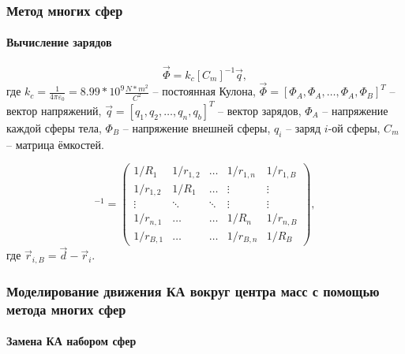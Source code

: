 \documentclass[10pt,pdf,hyperref={unicode}]{beamer}
\begin{document}
\begin{frame}
\frametitle{Метод  многих сфер}
\framesubtitle{Вычисление зарядов}
	\begin{equation*}
		\vec{\Phi} = k_c [C_m]^{-1} \vec{q},
	\end{equation*}
	\footnotesize{где $k_c = \frac{1}{4\pi\varepsilon_0} = 8.99 * 10^9 \frac{N*m^2}{C^2}$ – постоянная Кулона, $\vec{\Phi} = [\Phi_A, \Phi_A, \dots, \Phi_A, \Phi_B]^T$ – вектор напряжений, $\vec{q} = [q_1, q_2, \dots, q_n, q_b]^T$ – вектор зарядов, $\Phi_A$ – напряжение каждой сферы тела, $\Phi_B$ – напряжение внешней сферы, $q_i$ – заряд $i$-ой сферы, $C_m$ – матрица ёмкостей.}
	
	\begin{equation*}
		[C_m]^{-1} = 
		\begin{pmatrix}
			1/R_1	&	1/r_{1,2}	&	\dots		&	1/r_{1,n}	&	1/r_{1,B} \\
			1/r_{1,2}	&	1/R_1	&	\dots		&	\vdots		&	\vdots \\
			\vdots		&	\ddots		&	\ddots	&	\vdots		&	\vdots \\
			1/r_{n,1}	&	\dots			&	\dots		&	1/R_n	&	1/r_{n,B} \\
			1/r_{B,1}	&	\dots			&	\dots		&	1/r_{B,n}	&	1/R_B
		\end{pmatrix},
	\end{equation*}
	\footnotesize{где $\vec{r}_{i,B} = \vec{d} - \vec{r}_i$.}
\end{frame}

\begin{frame}
\frametitle{Моделирование движения КА вокруг центра масс с помощью метода многих сфер}
\framesubtitle{Замена КА набором сфер}
	\begin{figure}[H]
	\end{figure}
\end{frame}
\end{document}
